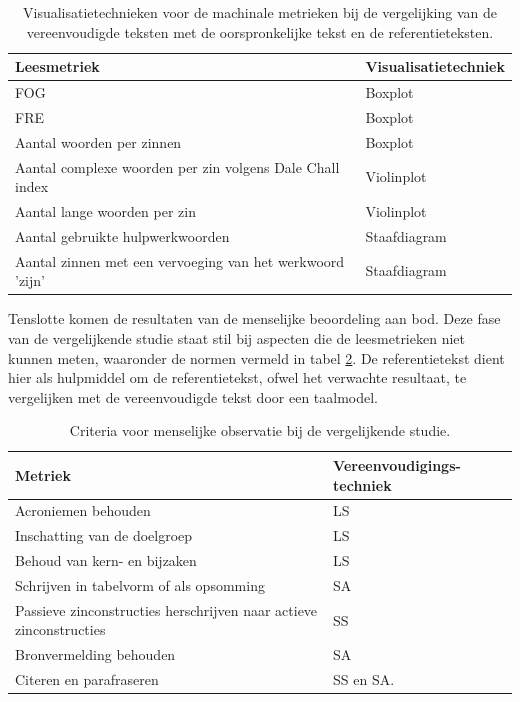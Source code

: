\begin{center}
	\begin{table}[H]
		\begin{tabular}{ | m{8cm} | m{7cm} | } 
			\hline
			\textbf{Leesmetriek} & \textbf{Visualisatietechniek }\\
			\hline
			FOG & Boxplot \\
			\hline
			FRE & Boxplot \\
			\hline
			Aantal woorden per zinnen & Boxplot \\
			\hline
			Aantal complexe woorden per zin volgens Dale Chall index & Violinplot \\
			\hline
			Aantal lange woorden per zin & Violinplot \\
			\hline
			Aantal gebruikte hulpwerkwoorden & Staafdiagram \\
			\hline
			Aantal zinnen met een vervoeging van het werkwoord 'zijn' & Staafdiagram \\
			\hline
		\end{tabular}
		\caption{Visualisatietechnieken voor de machinale metrieken bij de vergelijking van de vereenvoudigde teksten met de oorspronkelijke tekst en de referentieteksten.}
		\label{table:verg-studie-metrieken}
	\end{table}
\end{center}

Tenslotte komen de resultaten van de menselijke beoordeling aan bod. Deze fase van de vergelijkende studie staat stil bij aspecten die de leesmetrieken niet kunnen meten, waaronder de normen vermeld in tabel \ref{table:criteria-vergelijkende-studie-human-obv}. De referentietekst dient hier als hulpmiddel om de referentietekst, ofwel het verwachte resultaat, te vergelijken met de vereenvoudigde tekst door een taalmodel. 

\begin{table}[H]
	\begin{tabular}{| m{10cm} | m{4.5cm} |}
		\hline
		\textbf{Metriek} & \textbf{Vereenvoudigings- techniek} \\ \hline
		Acroniemen behouden & LS 	\\ \hline
		Inschatting van de doelgroep & LS	\\ \hline
		Behoud van kern- en bijzaken & LS \\ \hline
		Schrijven in tabelvorm of als opsomming & SA \\ \hline
		Passieve zinconstructies herschrijven naar actieve zinconstructies & SS \\ \hline
		Bronvermelding behouden &  SA \\ \hline
		Citeren en parafraseren & SS en SA. \\ \hline
	\end{tabular}
	\caption{Criteria voor menselijke observatie bij de vergelijkende studie.}
	\label{table:criteria-vergelijkende-studie-human-obv}
\end{table}

